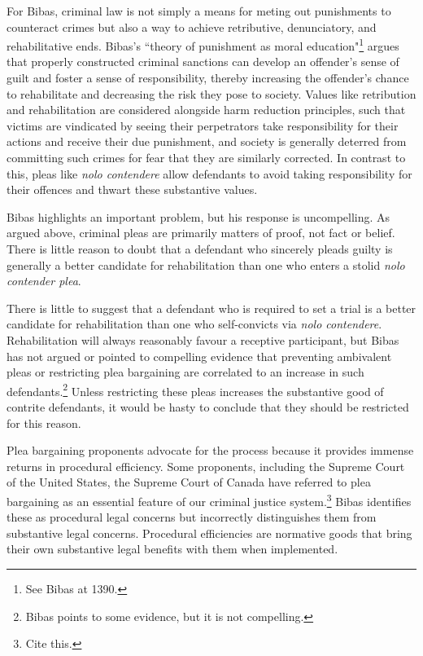 For Bibas, criminal law is not simply a means for meting out punishments to counteract crimes but also a way to achieve retributive, denunciatory, and rehabilitative ends. Bibas's ``theory of punishment as moral education"\footnote{See Bibas at 1390.} argues that properly constructed criminal sanctions can develop an offender's sense of guilt and foster a sense of responsibility, thereby increasing the offender's chance to rehabilitate and decreasing the risk they pose to society. Values like retribution and rehabilitation are considered alongside harm reduction principles, such that victims are vindicated by seeing their perpetrators take responsibility for their actions and receive their due punishment, and society is generally deterred from committing such crimes for fear that they are similarly corrected. In contrast to this, pleas like \textit{nolo contendere} allow defendants to avoid taking responsibility for their offences and thwart these substantive values.

Bibas highlights an important problem, but his response is uncompelling. As argued above, criminal pleas are primarily matters of proof, not fact or belief. There is little reason to doubt that a defendant who sincerely pleads guilty is generally a better candidate for rehabilitation than one who enters a stolid \textit{nolo contender plea}. 

There is little to suggest that a defendant who is required to set a trial is a better candidate for rehabilitation than one who self-convicts via \textit{nolo contendere}. Rehabilitation will always reasonably favour a receptive participant, but Bibas has not argued or pointed to compelling evidence that preventing ambivalent pleas or restricting plea bargaining are correlated to an increase in such defendants.\footnote{Bibas points to some evidence, but it is not compelling.} Unless restricting these pleas increases the substantive good of contrite defendants, it would be hasty to conclude that they should be restricted for this reason.

Plea bargaining proponents advocate for the process because it provides immense returns in procedural efficiency. Some proponents, including the Supreme Court of the United States, the Supreme Court of Canada have referred to plea bargaining as an essential feature of our criminal justice system.\footnote{Cite this.} Bibas identifies these as procedural legal concerns but incorrectly distinguishes them from substantive legal concerns. Procedural efficiencies are normative goods that bring their own substantive legal benefits with them when implemented. 

